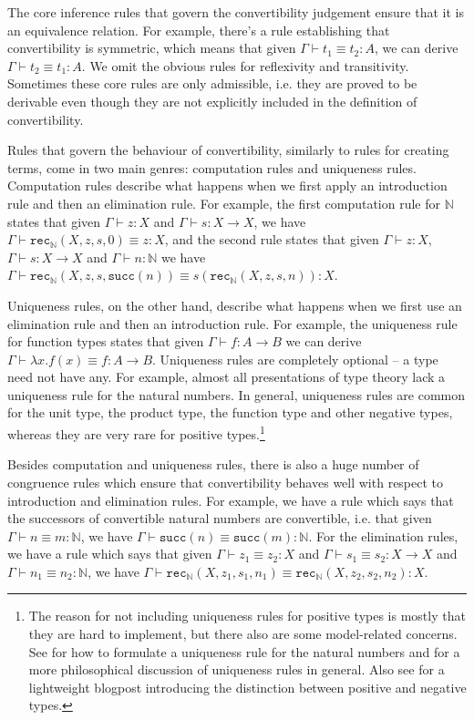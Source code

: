 \documentclass[declaration,mgr,english,shortabstract]{iithesis}
\newcommand{\m}[1]{\texttt{#1}}
\newcommand{\term}[3]{#1 \vdash #2 : #3}
\newcommand{\termconv}[4]{#1 \vdash #2 \equiv #3 : #4}
\newcommand{\N}{\mathbb{N}}
\newcommand{\suc}[1]{\m{succ}(#1)}
\newcommand{\recN}[4]{\m{rec}_\N(#1, #2, #3, #4)}
\begin{document}
The core inference rules that govern the convertibility judgement ensure that it is an equivalence relation. For example, there's a rule establishing that convertibility is symmetric, which means that given $\termconv{\Gamma}{t_1}{t_2}{A}$, we can derive $\termconv{\Gamma}{t_2}{t_1}{A}$. We omit the obvious rules for reflexivity and transitivity. Sometimes these core rules are only admissible, i.e. they are proved to be derivable even though they are not explicitly included in the definition of convertibility.

Rules that govern the behaviour of convertibility, similarly to rules for creating terms, come in two main genres: computation rules and uniqueness rules. Computation rules describe what happens when we first apply an introduction rule and then an elimination rule. For example, the first computation rule for $\N$ states that given $\term{\Gamma}{z}{X}$ and $\term{\Gamma}{s}{X \to X}$, we have $\termconv{\Gamma}{\recN{X}{z}{s}{0}}{z}{X}$, and the second rule states that given $\term{\Gamma}{z}{X}$, $\term{\Gamma}{s}{X \to X}$ and $\term{\Gamma}{n}{\N}$ we have $\termconv{\Gamma}{\recN{X}{z}{s}{\suc{n}}}{s(\recN{X}{z}{s}{n})}{X}$.

Uniqueness rules, on the other hand, describe what happens when we first use an elimination rule and then an introduction rule. For example, the uniqueness rule for function types states that given $\term{\Gamma}{f}{A \to B}$ we can derive $\termconv{\Gamma}{\lambda x.f(x)}{f}{A \to B}$. Uniqueness rules are completely optional -- a type need not have any. For example, almost all presentations of type theory lack a uniqueness rule for the natural numbers. In general, uniqueness rules are common for the unit type, the product type, the function type and other negative types, whereas they are very rare for positive types.\footnote{The reason for not including uniqueness rules for positive types is mostly that they are hard to implement, but there also are some model-related concerns. See \cite{Eta} for how to formulate a uniqueness rule for the natural numbers and for a more philosophical discussion of uniqueness rules in general. Also see \cite{Polarity} for a lightweight blogpost introducing the distinction between positive and negative types.}

Besides computation and uniqueness rules, there is also a huge number of congruence rules which ensure that convertibility behaves well with respect to introduction and elimination rules. For example, we have a rule which says that the successors of convertible natural numbers are convertible, i.e. that given $\termconv{\Gamma}{n}{m}{\N}$, we have $\termconv{\Gamma}{\suc{n}}{\suc{m}}{\N}$. For the elimination rules, we have a rule which says that given $\termconv{\Gamma}{z_1}{z_2}{X}$ and $\termconv{\Gamma}{s_1}{s_2}{X \to X}$ and $\termconv{\Gamma}{n_1}{n_2}{\N}$, we have $\termconv{\Gamma}{\recN{X}{z_1}{s_1}{n_1}}{\recN{X}{z_2}{s_2}{n_2}}{X}$.
\end{document}
